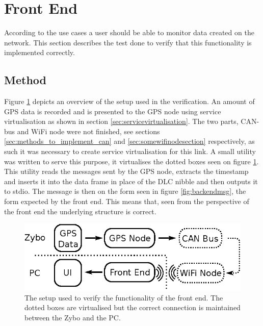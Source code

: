 
\section{Front End}
According to the use cases a user should be able to monitor data created on the network.
This section describes the test done to verify that this functionality is implemented correctly.
\subsection{Method}
Figure \ref{fig:frontendsetup} depicts an overview of the setup used in the verification.
An amount of GPS data is recorded and is presented to the GPS node using service virtualisation as shown in section \ref{sec:servicevirtualisation}.
The two parts, CAN-bus and WiFi node were not finished, see sections \ref{sec:methods_to_implement_can} and \ref{sec:somewifinodesection} respectively, as such it was necessary to create service virtualisation for this link.
A small utility was written to serve this purpose, it virtualises the dotted boxes seen on figure \ref{fig:frontendsetup}.
This utility reads the messages sent by the GPS node, extracts the timestamp and inserts it into the data frame in place of the DLC nibble and then outputs it to stdio.
The message is then on the form seen in figure \ref{fig:backendmsg}, the form expected by the front end.
This means that, seen from the perspective of the front end the underlying structure is correct.

\begin{figure}
	\centering
	\includegraphics[width=.75\linewidth]{graphics/frontend_verification}
	\caption{The setup used to verify the functionality of the front end. 
	The dotted boxes are virtualised but the correct connection is maintained between the Zybo and the PC.}
	\label{fig:frontendsetup}
\end{figure}

